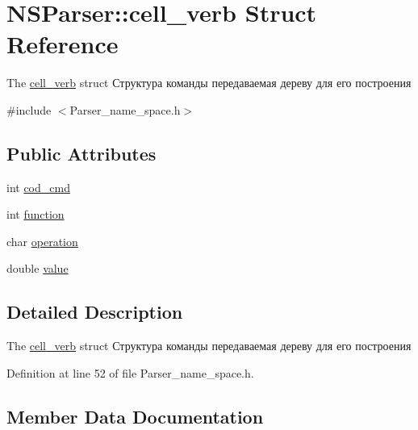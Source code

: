 \hypertarget{structNSParser_1_1cell__verb}{}\section{N\+S\+Parser\+:\+:cell\+\_\+verb Struct Reference}
\label{structNSParser_1_1cell__verb}


The \hyperlink{structNSParser_1_1cell__verb}{cell\+\_\+verb} struct Структура команды передаваемая дереву для его построения  




{\ttfamily \#include $<$Parser\+\_\+name\+\_\+space.\+h$>$}

\subsection*{Public Attributes}
\begin{DoxyCompactItemize}
\item 
int \hyperlink{structNSParser_1_1cell__verb_a71c80dd322f510111134723368aa4470}{cod\+\_\+cmd}
\item 
int \hyperlink{structNSParser_1_1cell__verb_ae01137555ad15a3c3cd22018588c5c1d}{function}
\item 
char \hyperlink{structNSParser_1_1cell__verb_a41d5d55651956c9d353f33b1aedb1fb2}{operation}
\item 
double \hyperlink{structNSParser_1_1cell__verb_a8b0aa5da814292043c02ac6bd7544a6f}{value}
\end{DoxyCompactItemize}


\subsection{Detailed Description}
The \hyperlink{structNSParser_1_1cell__verb}{cell\+\_\+verb} struct Структура команды передаваемая дереву для его построения 

Definition at line 52 of file Parser\+\_\+name\+\_\+space.\+h.



\subsection{Member Data Documentation}
\hypertarget{structNSParser_1_1cell__verb_a71c80dd322f510111134723368aa4470}{}
